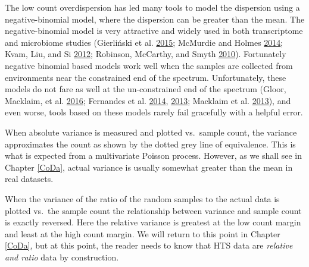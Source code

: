 \documentclass[onecolumn]{book}
\theoremstyle{definition}
\theoremstyle{definition}
\theoremstyle{definition}
\theoremstyle{remark}
\begin{document}
The low count overdispersion has led many tools to model the dispersion
using a negative-binomial model, where the dispersion can be greater
than the mean. The negative-binomial model is very attractive and widely
used in both transcriptome and microbiome studies (Gierliński et al.
\protect\hyperlink{ref-Gierlinski:2015aa}{2015}; McMurdie and Holmes
\protect\hyperlink{ref-McMurdie:2014a}{2014}; Kvam, Liu, and Si
\protect\hyperlink{ref-Kvam:2012}{2012}; Robinson, McCarthy, and Smyth
\protect\hyperlink{ref-Robinson:2010}{2010}). Fortunately negative
binomial based models work well when the samples are collected from
environments near the constrained end of the spectrum. Unfortunately,
these models do not fare as well at the un-constrained end of the
spectrum (Gloor, Macklaim, et al.
\protect\hyperlink{ref-gloorAJS:2016}{2016}; Fernandes et al.
\protect\hyperlink{ref-fernandes:2014}{2014},
\protect\hyperlink{ref-fernandes:2013}{2013}; Macklaim et al.
\protect\hyperlink{ref-macklaim:2013}{2013}), and even worse, tools
based on these models rarely fail gracefully with a helpful error.

When absolute variance is measured and plotted vs.~sample count, the
variance approximates the count as shown by the dotted grey line of
equivalence. This is what is expected from a multivariate Poisson
process. However, as we shall see in Chapter \ref{CoDa}, actual variance
is usually somewhat greater than the mean in real datasets.

When the variance of the ratio of the random samples to the actual data
is plotted vs.~the sample count the relationship between variance and
sample count is exactly reversed. Here the relative variance is greatest
at the low count margin and least at the high count margin. We will
return to this point in Chapter \ref{CoDa}, but at this point, the
reader needs to know that HTS data are \emph{relative and ratio} data by
construction.
\end{document}
